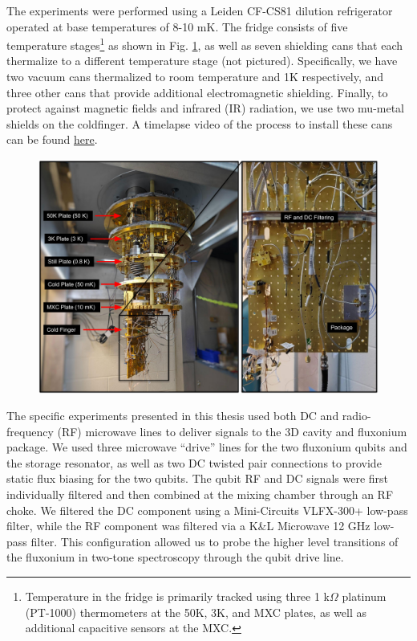 The experiments were performed using a Leiden CF-CS81 dilution refrigerator operated at base temperatures of 8-10 mK. The fridge consists of five temperature stages\footnote{Temperature in the fridge is primarily tracked using three 1 k$\Omega$ platinum (PT-1000) thermometers at the 50K, 3K, and MXC plates, as well as additional capacitive sensors at the MXC. } as shown in Fig. \ref{fig:4-fridge-wiring}, as well as seven shielding cans that each thermalize to a different temperature stage (not pictured). Specifically, we have two vacuum cans thermalized to room temperature and 1K respectively, and three other cans that provide additional electromagnetic shielding. Finally, to protect against magnetic fields and infrared (IR) radiation, we use two mu-metal shields  on the coldfinger. A timelapse video of the process to install these cans can be found \href{https://youtu.be/KkvUc9Aw77s?t=829}{here}. 

\begin{figure}[h]
    \centering
    \includegraphics[width=0.9\linewidth]{Figures/4/Fridge-Wiring.pdf}
    \caption{}
    \label{fig:4-fridge-wiring}
\end{figure}

The specific experiments presented in this thesis used both DC and radio-frequency (RF) microwave lines to deliver signals to the 3D cavity and fluxonium package. We used three microwave ``drive'' lines for the two fluxonium qubits and the storage resonator, as well as two DC twisted pair connections to provide static flux biasing for the two qubits. The qubit RF and DC signals were first individually filtered and then combined at the mixing chamber through an RF choke. We filtered the DC component using a Mini-Circuits VLFX-300+ low-pass filter, while the RF component was filtered via a K\&L Microwave 12 GHz low-pass filter. This configuration allowed us to probe the higher level transitions of the fluxonium in two-tone spectroscopy through the qubit drive line. 

